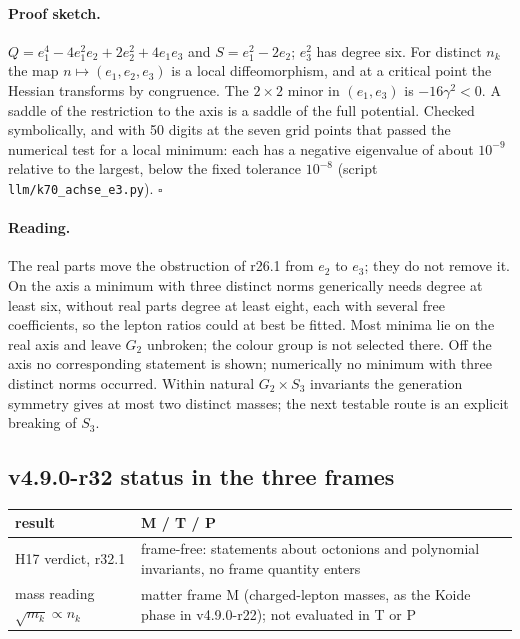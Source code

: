 \paragraph{Proof sketch.}
\(Q=e_1^4-4e_1^2e_2+2e_2^2+4e_1e_3\) and \(S=e_1^2-2e_2\); \(e_3^2\) has degree six.  For distinct \(n_k\) the map
\(n\mapsto(e_1,e_2,e_3)\) is a local diffeomorphism, and at a critical point the Hessian transforms by congruence.  The
\(2\times2\) minor in \((e_1,e_3)\) is \(-16\gamma^2<0\).  A saddle of the restriction to the axis is a saddle of the
full potential.  Checked symbolically, and with 50 digits at the seven grid points that passed the numerical test for a
local minimum: each has a negative eigenvalue of about \(10^{-9}\) relative to the largest, below the fixed tolerance
\(10^{-8}\) (script \texttt{llm/k70\_achse\_e3.py}).  \(\square\)

\paragraph{Reading.}
The real parts move the obstruction of r26.1 from \(e_2\) to \(e_3\); they do not remove it.  On the axis a minimum with
three distinct norms generically needs degree at least six, without real parts degree at least eight, each with
several free coefficients, so the lepton ratios could at best be fitted.  Most minima lie on the real axis and leave
\(G_2\) unbroken; the colour group is not selected there.  Off the axis no corresponding statement is shown; numerically
no minimum with three distinct norms occurred.  Within natural \(G_2\times S_3\) invariants the generation symmetry gives
at most two distinct masses; the next testable route is an explicit breaking of \(S_3\).

\subsection*{v4.9.0-r32 status in the three frames}
\label{subsec:v490-r32-frames}

\begin{center}
\small
\begin{tabular}{@{}>{\raggedright\arraybackslash}p{}>{\raggedright\arraybackslash}p{}@{}}
\toprule
result & M / T / P\\
\midrule
H17 verdict, r32.1 & frame-free: statements about octonions and polynomial invariants, no frame quantity enters\\
mass reading \(\sqrt{m_k}\propto n_k\) & matter frame M (charged-lepton masses, as the Koide phase in v4.9.0-r22); not evaluated in T or P\\
\bottomrule
\end{tabular}
\end{center}

